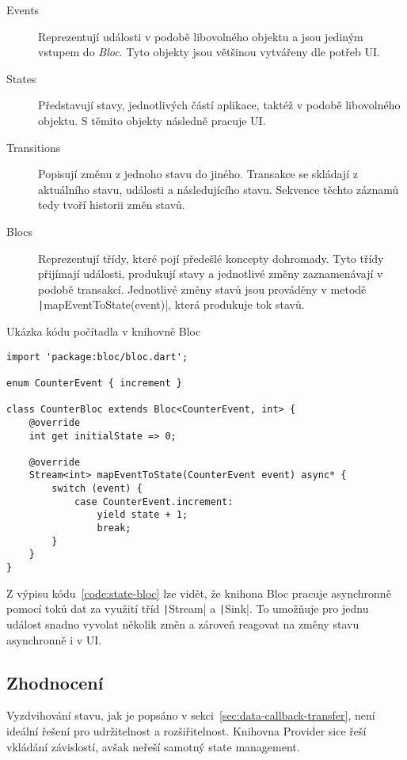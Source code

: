 \begin{description}
    \item[Events] Reprezentují události v podobě libovolného objektu
    a jsou jediným vstupem do \emph{Bloc}.
    Tyto objekty jsou většinou vytvářeny dle potřeb UI.
    \item[States] Představují stavy,
    jednotlivých částí aplikace,
    taktéž v podobě libovolného objektu.
    S těmito objekty následně pracuje UI.
    \item[Transitions] Popisují změnu z jednoho stavu do jiného.
    Transakce se skládají z aktuálního stavu, události a následujícího stavu.
    Sekvence těchto záznamů tedy tvoří historii změn stavů.
    \item[Blocs] Reprezentují třídy,
    které pojí předešlé koncepty dohromady.
    Tyto třídy přijímají události, produkují stavy a jednotlivé změny
    zaznamenávají v podobě transakcí.
    Jednotlivé změny stavů jsou prováděny v metodě
    \texttt|mapEventToState(event)|,
    která produkuje tok stavů.
\end{description}

\begin{listing}
    \caption{Ukázka kódu počítadla v knihovně
    Bloc~\cite{bloclibrary_coreconcepts}}
    \label{code:state-bloc}
    \begin{verbatim}
import 'package:bloc/bloc.dart';

enum CounterEvent { increment }

class CounterBloc extends Bloc<CounterEvent, int> {
    @override
    int get initialState => 0;

    @override
    Stream<int> mapEventToState(CounterEvent event) async* {
        switch (event) {
            case CounterEvent.increment:
                yield state + 1;
                break;
        }
    }
}
    \end{verbatim}
\end{listing}

Z výpisu kódu~\ref{code:state-bloc} lze vidět,
že knihona Bloc pracuje asynchronně pomocí toků dat za využití
tříd \texttt|Stream| a \texttt|Sink|.
To umožňuje pro jednu událost snadno vyvolat několik změn
a zároveň reagovat na změny stavu asynchronně i v UI.

\subsection{Zhodnocení}

Vyzdvihování stavu,
jak je popsáno v sekci~\ref{sec:data-callback-transfer},
není ideální řešení pro udržitelnost a rozšiřitelnost.
Knihovna Provider sice řeší vkládání závislostí,
avšak neřeší samotný state management.

